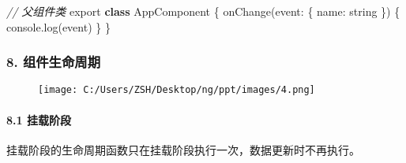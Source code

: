 \documentclass[
]{article}
\newenvironment{Shaded}{}{}
\newcommand{\BuiltInTok}[1]{#1}
\newcommand{\CommentTok}[1]{\textcolor[rgb]{0.38,0.63,0.69}{\textit{#1}}}
\newcommand{\DataTypeTok}[1]{\textcolor[rgb]{0.56,0.13,0.00}{#1}}
\newcommand{\FunctionTok}[1]{\textcolor[rgb]{0.02,0.16,0.49}{#1}}
\newcommand{\ImportTok}[1]{#1}
\newcommand{\KeywordTok}[1]{\textcolor[rgb]{0.00,0.44,0.13}{\textbf{#1}}}
\newcommand{\NormalTok}[1]{#1}
\newcommand{\OperatorTok}[1]{\textcolor[rgb]{0.40,0.40,0.40}{#1}}
\newcommand{\OtherTok}[1]{\textcolor[rgb]{0.00,0.44,0.13}{#1}}
\newcommand{\StringTok}[1]{\textcolor[rgb]{0.25,0.44,0.63}{#1}}
\begin{document}
\begin{Shaded}
\end{Shaded}

\begin{Shaded}
\begin{Highlighting}[]
\CommentTok{// 父组件类}
\ImportTok{export} \KeywordTok{class}\NormalTok{ AppComponent \{}
  \FunctionTok{onChange}\NormalTok{(}\DataTypeTok{event}\OperatorTok{:}\NormalTok{ \{ }\DataTypeTok{name}\OperatorTok{:}\NormalTok{ string \}) \{}
    \BuiltInTok{console}\OperatorTok{.}\FunctionTok{log}\NormalTok{(}\BuiltInTok{event}\NormalTok{)}
\NormalTok{  \}}
\NormalTok{\}}
\end{Highlighting}
\end{Shaded}

\hypertarget{8-ux7ec4ux4ef6ux751fux547dux5468ux671f}{%
\subsubsection{8.
组件生命周期}\label{8-ux7ec4ux4ef6ux751fux547dux5468ux671f}}

\begin{figure}
\centering
\texttt{[image: C:/Users/ZSH/Desktop/ng/ppt/images/4.png]}
\caption{}
\end{figure}

\hypertarget{81-ux6302ux8f7dux9636ux6bb5}{%
\paragraph{8.1 挂载阶段}\label{81-ux6302ux8f7dux9636ux6bb5}}

挂载阶段的生命周期函数只在挂载阶段执行一次，数据更新时不再执行。
\end{document}
